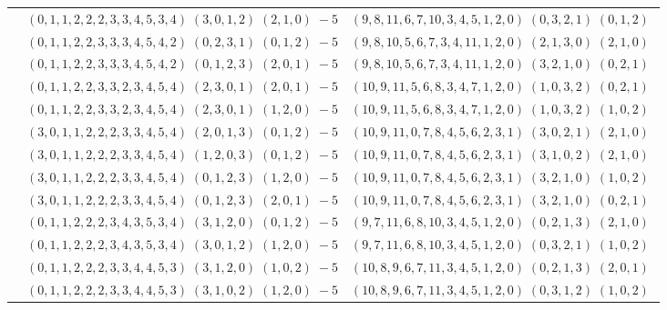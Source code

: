 \documentclass[11pt]{article}
\begin{document}
\begin{longtable}[l]{|c|c|c|}
 \cline{2-3} 
 & $(0 ,1 ,1 ,2 ,2 ,2 ,3 ,3 ,4 ,5 ,3 ,4) \;(3 ,0 ,1 ,2) \;(2 ,1 ,0) \;-5$ & $(9 ,8 ,11 ,6 ,7 ,10 ,3 ,4 ,5 ,1 ,2 ,0) \;(0 ,3 ,2 ,1) \;(0 ,1 ,2) \;$\\ 
 \cline{2-3} 
 & $(0 ,1 ,1 ,2 ,2 ,3 ,3 ,3 ,4 ,5 ,4 ,2) \;(0 ,2 ,3 ,1) \;(0 ,1 ,2) \;-5$ & $(9 ,8 ,10 ,5 ,6 ,7 ,3 ,4 ,11 ,1 ,2 ,0) \;(2 ,1 ,3 ,0) \;(2 ,1 ,0) \;$\\ 
 \cline{2-3} 
 & $(0 ,1 ,1 ,2 ,2 ,3 ,3 ,3 ,4 ,5 ,4 ,2) \;(0 ,1 ,2 ,3) \;(2 ,0 ,1) \;-5$ & $(9 ,8 ,10 ,5 ,6 ,7 ,3 ,4 ,11 ,1 ,2 ,0) \;(3 ,2 ,1 ,0) \;(0 ,2 ,1) \;$\\ 
 \cline{2-3} 
 & $(0 ,1 ,1 ,2 ,2 ,3 ,3 ,2 ,3 ,4 ,5 ,4) \;(2 ,3 ,0 ,1) \;(2 ,0 ,1) \;-5$ & $(10 ,9 ,11 ,5 ,6 ,8 ,3 ,4 ,7 ,1 ,2 ,0) \;(1 ,0 ,3 ,2) \;(0 ,2 ,1) \;$\\ 
 \cline{2-3} 
 & $(0 ,1 ,1 ,2 ,2 ,3 ,3 ,2 ,3 ,4 ,5 ,4) \;(2 ,3 ,0 ,1) \;(1 ,2 ,0) \;-5$ & $(10 ,9 ,11 ,5 ,6 ,8 ,3 ,4 ,7 ,1 ,2 ,0) \;(1 ,0 ,3 ,2) \;(1 ,0 ,2) \;$\\ 
 \cline{2-3} 
 & $(3 ,0 ,1 ,1 ,2 ,2 ,2 ,3 ,3 ,4 ,5 ,4) \;(2 ,0 ,1 ,3) \;(0 ,1 ,2) \;-5$ & $(10 ,9 ,11 ,0 ,7 ,8 ,4 ,5 ,6 ,2 ,3 ,1) \;(3 ,0 ,2 ,1) \;(2 ,1 ,0) \;$\\ 
 \cline{2-3} 
 & $(3 ,0 ,1 ,1 ,2 ,2 ,2 ,3 ,3 ,4 ,5 ,4) \;(1 ,2 ,0 ,3) \;(0 ,1 ,2) \;-5$ & $(10 ,9 ,11 ,0 ,7 ,8 ,4 ,5 ,6 ,2 ,3 ,1) \;(3 ,1 ,0 ,2) \;(2 ,1 ,0) \;$\\ 
 \cline{2-3} 
 & $(3 ,0 ,1 ,1 ,2 ,2 ,2 ,3 ,3 ,4 ,5 ,4) \;(0 ,1 ,2 ,3) \;(1 ,2 ,0) \;-5$ & $(10 ,9 ,11 ,0 ,7 ,8 ,4 ,5 ,6 ,2 ,3 ,1) \;(3 ,2 ,1 ,0) \;(1 ,0 ,2) \;$\\ 
 \cline{2-3} 
 & $(3 ,0 ,1 ,1 ,2 ,2 ,2 ,3 ,3 ,4 ,5 ,4) \;(0 ,1 ,2 ,3) \;(2 ,0 ,1) \;-5$ & $(10 ,9 ,11 ,0 ,7 ,8 ,4 ,5 ,6 ,2 ,3 ,1) \;(3 ,2 ,1 ,0) \;(0 ,2 ,1) \;$\\ 
 \cline{2-3} 
 & $(0 ,1 ,1 ,2 ,2 ,2 ,3 ,4 ,3 ,5 ,3 ,4) \;(3 ,1 ,2 ,0) \;(0 ,1 ,2) \;-5$ & $(9 ,7 ,11 ,6 ,8 ,10 ,3 ,4 ,5 ,1 ,2 ,0) \;(0 ,2 ,1 ,3) \;(2 ,1 ,0) \;$\\ 
 \cline{2-3} 
 & $(0 ,1 ,1 ,2 ,2 ,2 ,3 ,4 ,3 ,5 ,3 ,4) \;(3 ,0 ,1 ,2) \;(1 ,2 ,0) \;-5$ & $(9 ,7 ,11 ,6 ,8 ,10 ,3 ,4 ,5 ,1 ,2 ,0) \;(0 ,3 ,2 ,1) \;(1 ,0 ,2) \;$\\ 
 \cline{2-3} 
 & $(0 ,1 ,1 ,2 ,2 ,2 ,3 ,3 ,4 ,4 ,5 ,3) \;(3 ,1 ,2 ,0) \;(1 ,0 ,2) \;-5$ & $(10 ,8 ,9 ,6 ,7 ,11 ,3 ,4 ,5 ,1 ,2 ,0) \;(0 ,2 ,1 ,3) \;(2 ,0 ,1) \;$\\ 
 \cline{2-3} 
 & $(0 ,1 ,1 ,2 ,2 ,2 ,3 ,3 ,4 ,4 ,5 ,3) \;(3 ,1 ,0 ,2) \;(1 ,2 ,0) \;-5$ & $(10 ,8 ,9 ,6 ,7 ,11 ,3 ,4 ,5 ,1 ,2 ,0) \;(0 ,3 ,1 ,2) \;(1 ,0 ,2) \;$\\ 

\end{longtable}
\end{document}
